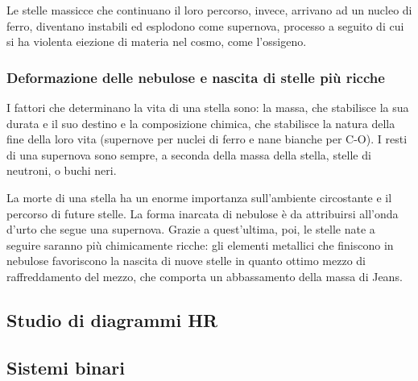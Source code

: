 \documentclass[11pt, a4paper]{scrartcl}
\theoremstyle{style}
\theoremstyle{style1}
\numberwithin{equation}{subsection}
\begin{document}
Le stelle massicce che continuano il loro percorso, invece, arrivano ad un nucleo di ferro, diventano instabili ed esplodono come supernova, processo a seguito di cui si ha violenta eiezione di materia nel cosmo, come l'ossigeno.

\subsubsection{Deformazione delle nebulose e nascita di stelle pi\`u ricche}
I fattori che determinano la vita di una stella sono: la massa, che stabilisce la sua durata e il suo destino e la composizione chimica, che stabilisce la natura della fine della loro vita (supernove per nuclei di ferro e nane bianche per C-O).
I resti di una supernova sono sempre, a seconda della massa della stella, stelle di neutroni, o buchi neri.

La morte di una stella ha un enorme importanza sull'ambiente circostante e il percorso di future stelle.
La forma inarcata di nebulose \`e da attribuirsi all'onda d'urto che segue una supernova.
Grazie a quest'ultima, poi, le stelle nate a seguire saranno pi\`u chimicamente ricche: gli elementi metallici che finiscono in nebulose favoriscono la nascita di nuove stelle in quanto ottimo mezzo di raffreddamento del mezzo, che comporta un abbassamento della massa di Jeans.

\subsection{Studio di diagrammi HR}

\subsection{Sistemi binari}
\end{document}
